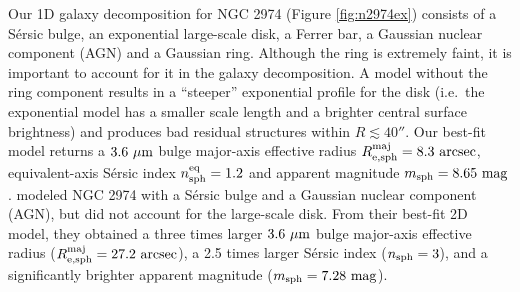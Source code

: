 \documentclass[preprint2]{emulateapj}
\begin{document}
Our 1D galaxy decomposition for NGC 2974 (Figure \ref{fig:n2974ex}) consists of a S\'ersic bulge, an exponential large-scale disk,
a Ferrer bar, a Gaussian nuclear component (AGN) and a Gaussian ring.
Although the ring is extremely faint, it is important to account for it in the galaxy decomposition. 
A model without the ring component results in a ``steeper'' exponential profile for the disk 
(i.e.~the exponential model has a smaller scale length and a brighter central surface brightness) 
and produces bad residual structures within $R \lesssim 40''$.
Our best-fit model returns a $3.6~\rm \mu m$ bulge major-axis effective radius $R_{\rm e,sph}^{\rm maj} = 8.3\rm~arcsec$, 
equivalent-axis S\'ersic index $n_{\rm sph}^{\rm eq} = 1.2$ and apparent magnitude $m_{\rm sph} = 8.65~\rm mag$.
\cite{sani2011} modeled NGC 2974 with a S\'ersic bulge and a Gaussian nuclear component (AGN), 
but did not account for the large-scale disk.
From their best-fit 2D model, they obtained a three times larger 
$3.6~\rm \mu m$ bulge major-axis effective radius ($R_{\rm e,sph}^{\rm maj} = 27.2\rm~arcsec$), 
a 2.5 times larger S\'ersic index ($n_{\rm sph} = 3$),
and a significantly brighter apparent magnitude ($m_{\rm sph} = 7.28~\rm mag$).


\end{document}
